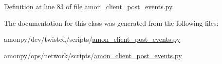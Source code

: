 Definition at line 83 of file amon\-\_\-client\-\_\-post\-\_\-events.\-py.



The documentation for this class was generated from the following files\-:\begin{DoxyCompactItemize}
\item 
amonpy/dev/twisted/scripts/\hyperlink{dev_2twisted_2scripts_2amon__client__post__events_8py}{amon\-\_\-client\-\_\-post\-\_\-events.\-py}\item 
amonpy/ops/network/scripts/\hyperlink{ops_2network_2scripts_2amon__client__post__events_8py}{amon\-\_\-client\-\_\-post\-\_\-events.\-py}\end{DoxyCompactItemize}
